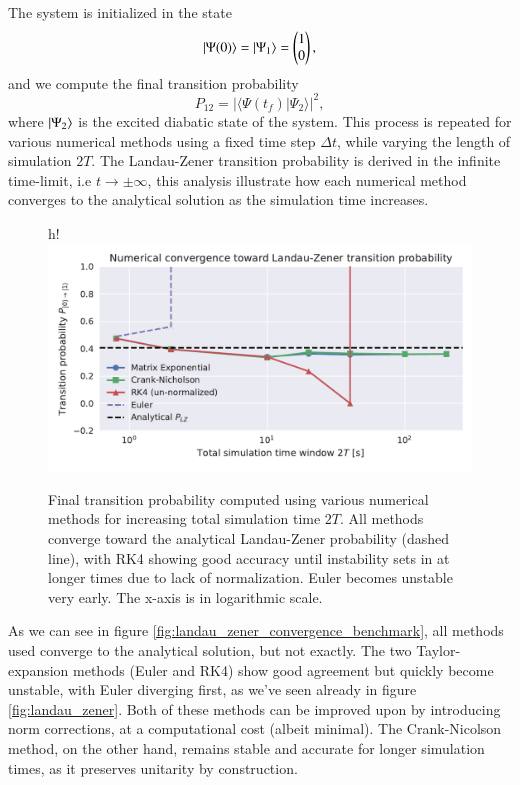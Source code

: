 \documentclass{subfiles}
\begin{document}
The system is initialized in the state $$\ket{\Psi(0)} = \ket{\Psi_1} = \begin{pmatrix} 1 \\ 0 \end{pmatrix},$$ and we compute the final transition probability $$P_{12} = |\langle \Psi(t_f) | \Psi_2 \rangle|^2,$$ where $\ket{\Psi_2}$ is the excited diabatic state of the system. This process is repeated for various numerical methods using a fixed time step $\Delta t$, while varying the length of simulation $2T$. The Landau-Zener transition probability is derived in the infinite time-limit, i.e $t\rightarrow \pm \infty$, this analysis illustrate how each numerical method converges to the analytical solution as the simulation time increases.
\begin{figure}{h!}
\centering
\includegraphics[width=1.0\textwidth]{figs/landau_zener_convergence_benchmark.pdf}
\caption{Final transition probability computed using various numerical methods for increasing total simulation time $
2T$. All methods converge toward the analytical Landau-Zener probability (dashed line), with RK4 showing good accuracy until instability sets in at longer times due to lack of normalization. Euler becomes unstable very early. The x-axis is in logarithmic scale.}
\end{figure}

As we can see in figure \eqref{fig:landau_zener_convergence_benchmark}, all methods used converge to the analytical solution, but not exactly. The two Taylor-expansion methods (Euler and RK4) show good agreement but quickly become unstable, with Euler diverging first, as we've seen already in figure \eqref{fig:landau_zener}. Both of these methods can be improved upon by introducing norm corrections, at a computational cost (albeit minimal). The Crank-Nicolson method, on the other hand, remains stable and accurate for longer simulation times, as it preserves unitarity by construction. 
\\ \\ 
\end{document}
